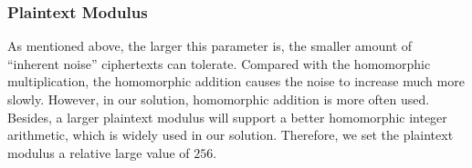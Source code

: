 \subsubsection{Plaintext Modulus}
As mentioned above, the larger this parameter is, the smaller amount of ``inherent noise'' ciphertexts can tolerate. Compared with the homomorphic multiplication, the homomorphic addition causes the noise to increase much more slowly. However, in our solution, homomorphic addition is more often used. Besides, a larger plaintext modulus will support a better homomorphic integer arithmetic, which is widely used in our solution. Therefore, we set the plaintext modulus a relative large value of $256$.







